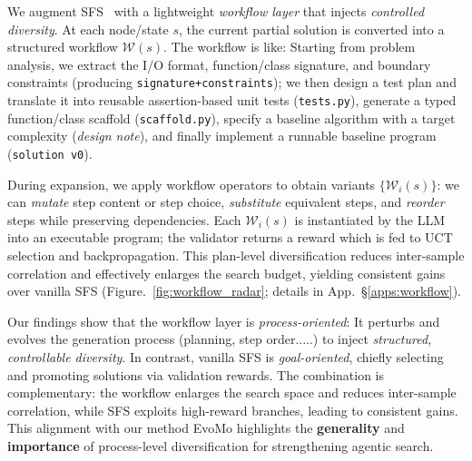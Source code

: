 \documentclass{article} %
\theoremstyle{definition}
\theoremstyle{remark}
\newcommand{\ourmethod}{{\fontfamily{lmtt}\selectfont EvoMo}\xspace}
\begin{document}
We augment SFS~\citep{light2025sfs} with a lightweight \emph{workflow layer} that injects
\emph{controlled diversity}. At each node/state $s$, the current partial
solution is converted into a structured workflow $\mathcal{W}(s)$. The workflow is like: Starting from problem analysis, we extract the I/O format, function/class signature, and boundary constraints (producing \texttt{signature+constraints}); we then design a test plan and translate it into reusable assertion-based unit tests (\texttt{tests.py}), generate a typed function/class scaffold (\texttt{scaffold.py}), specify a baseline algorithm with a target complexity (\emph{design note}), and finally implement a runnable baseline program (\texttt{solution v0}).
 



During expansion, we apply workflow
operators to obtain variants $\{\mathcal{W}_i(s)\}$: we can \emph{mutate} step
content or step choice, \emph{substitute} equivalent steps, and \emph{reorder}
steps while preserving dependencies. Each $\mathcal{W}_i(s)$ is instantiated by
the LLM into an executable program; the validator returns a reward which is fed
to UCT selection and backpropagation. This plan-level diversification reduces inter-sample correlation
and effectively enlarges the search budget, yielding consistent gains over
vanilla SFS (Figure.~\ref{fig:workflow_radar}; details in App.~\S\ref{apps:workflow}).


Our findings show that the workflow layer is \emph{process-oriented}:
It perturbs and evolves the generation process (planning, step order.....) to inject \emph{structured, controllable
diversity}. In contrast, vanilla SFS is \emph{goal-oriented}, chiefly
selecting and promoting solutions via validation rewards. The combination
is complementary: the workflow enlarges the search space and reduces
inter-sample correlation, while SFS exploits high-reward branches,
leading to consistent gains. This alignment with our method \ourmethod highlights the \textbf{generality} and
\textbf{importance} of process-level diversification for strengthening
agentic search. 
\end{document}
